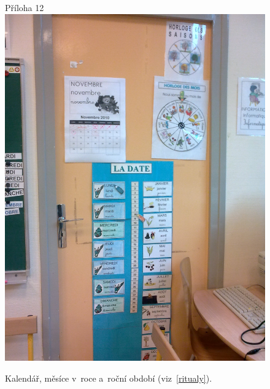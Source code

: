 	\begin{figure}[tb]
		\centering
		Příloha 12\\
		\includegraphics[height=0.35\textheight]{./fotky/Obr12.jpg}
		\caption{
			Kalendář, měsíce v~roce a~roční období (viz~\ref{ritualy}).
		}
		\label{Obr12}
	\end{figure}

